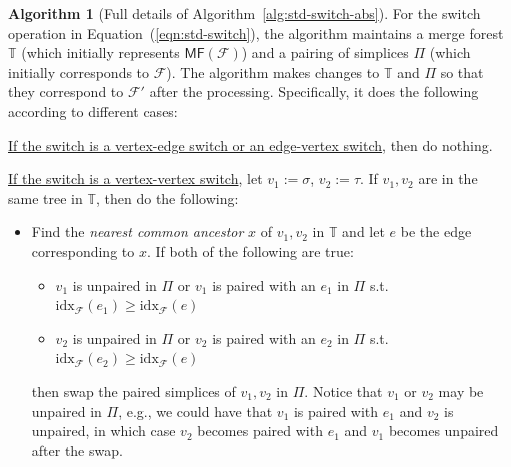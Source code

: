 \documentclass[letterpaper,11pt]{article}
\theoremstyle{mythmstyle}
\theoremstyle{mydefstyle}
\newtheorem{algr}[algorithm]{Algorithm}
\theoremstyle{plain}
\theoremstyle{definition}
\newtheorem{algr}{Algorithm}
\newcommand{\<}[1]{\langle #1\rangle}
\newcommand{\MF}{\mathsf{MF}}
\newcommand{\idx}{\mathrm{idx}}
\newcommand{\Fcal}{\mathcal{F}}
\newcommand{\sG}{\sigma}
\newcommand{\tG}{\tau}
\newcommand{\Fpo}{\mathbb{T}}
\theoremstyle{definition}
\begin{document}
\begin{algr}[Full details of Algorithm~\ref{alg:std-switch-abs}]\label{alg:std-switch-full}
For the switch operation in Equation~(\ref{eqn:std-switch}),
the algorithm maintains a merge forest $\Fpo$
(which initially represents $\MF(\Fcal)$)
and a pairing of simplices $\Pi$
(which initially corresponds to $\Fcal$).
The algorithm makes changes
to $\Fpo$ and $\Pi$
so that they correspond to $\Fcal'$
after the processing.
Specifically, 
it does the following according to different cases:

\smallskip\noindent
\underline{If the switch is a vertex-edge switch or an edge-vertex switch},
then do nothing.

\smallskip
\noindent \underline{If the switch is a vertex-vertex switch}, let 
    $v_1:=\sG$, $v_2:=\tG$.
    If $v_1,v_2$ are in the same tree in $\Fpo$,
    then do the following:
        \begin{itemize}
            \item
            Find the \emph{nearest common ancestor} $x$ of $v_1,v_2$ in $\Fpo$
            and let $e$ be the edge corresponding to $x$.
            If both of the following are true:
            \begin{itemize}
                \item $v_1$ is unpaired in $\Pi$ or $v_1$ is paired with an $e_1$ in $\Pi$ s.t.\ $\idx_\Fcal(e_1)\geq \idx_\Fcal(e)$
                \item $v_2$ is unpaired in $\Pi$ or $v_2$ is paired with an $e_2$ in $\Pi$ s.t.\ $\idx_\Fcal(e_2)\geq \idx_\Fcal(e)$
            \end{itemize}
            then  swap the paired simplices of $v_1,v_2$ in $\Pi$. Notice that 
            $v_1$ or $v_2$ may be unpaired in $\Pi$, e.g., 
            we could have that $v_1$ is paired with $e_1$ and $v_2$ is unpaired,
            in which case $v_2$ becomes paired with $e_1$
            and $v_1$ becomes unpaired after the swap.
            
        \end{itemize}

   
   

\end{algr}
\end{document}
